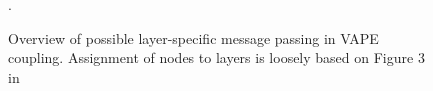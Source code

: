 \begin{figure}
  \centering

  \small

  \newcommand{\w}[1]{\textcolor{white}{#1}}
  \def\svgwidth{0.9\textwidth}


  \caption{Overview of possible layer-specific message passing in \textsf{VAPE} coupling. Assignment of nodes to layers is loosely based on Figure 3 in \cite{Shipp2016}}.
\end{figure}